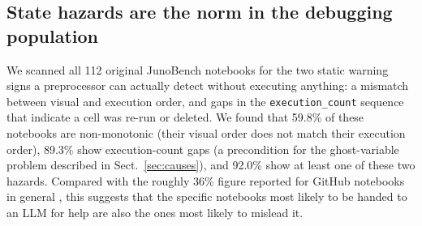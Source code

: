 \documentclass[11pt]{article}
\begin{document}
\subsection{State hazards are the norm in the debugging population}
\label{sec:scan}
We scanned all 112 original JunoBench notebooks for the two static
warning signs a preprocessor can actually detect without executing
anything: a mismatch between visual and execution order, and gaps in the
\texttt{execution\_count} sequence that indicate a cell was re-run or
deleted. We found that 59.8\% of these notebooks are non-monotonic
(their visual order does not match their execution order), 89.3\% show
execution-count gaps (a precondition for the ghost-variable problem
described in Sect.~\ref{sec:causes}), and 92.0\% show at least one of
these two hazards. Compared with the roughly 36\% figure reported for
GitHub notebooks in general \citep{siddik2025}, this suggests that the
specific notebooks most likely to be handed to an LLM for help are also
the ones most likely to mislead it.
\end{document}
